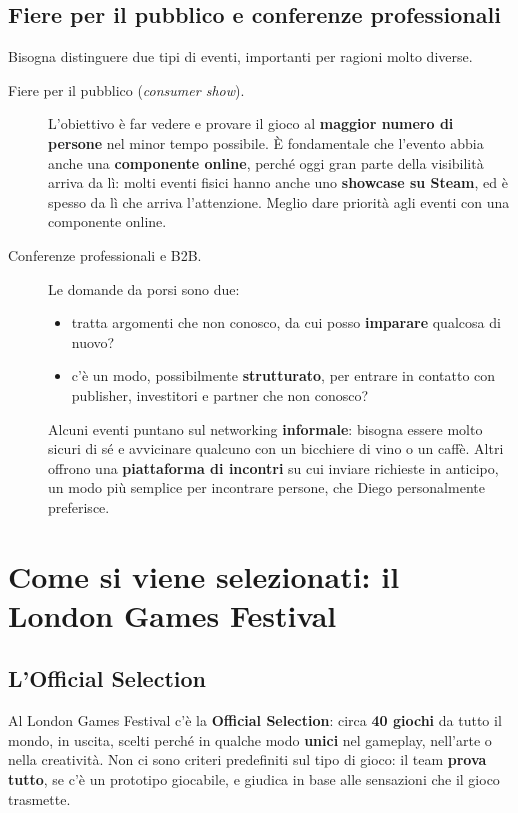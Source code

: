 \subsection{Fiere per il pubblico e conferenze professionali}

Bisogna distinguere due tipi di eventi, importanti per ragioni molto diverse.
\begin{description}
  \item[Fiere per il pubblico (\emph{consumer show}).] L'obiettivo è far vedere e
        provare il gioco al \textbf{maggior numero di persone} nel minor tempo
        possibile. È fondamentale che l'evento abbia anche una
        \textbf{componente online}, perché oggi gran parte della visibilità
        arriva da lì: molti eventi fisici hanno anche uno \textbf{showcase su
        Steam}, ed è spesso da lì che arriva l'attenzione. Meglio dare priorità
        agli eventi con una componente online.
  \item[Conferenze professionali e B2B.] Le domande da porsi sono due:
        \begin{itemize}
          \item tratta argomenti che non conosco, da cui posso \textbf{imparare}
                qualcosa di nuovo?
          \item c'è un modo, possibilmente \textbf{strutturato}, per entrare in
                contatto con publisher, investitori e partner che non conosco?
        \end{itemize}
        Alcuni eventi puntano sul networking \textbf{informale}: bisogna essere
        molto sicuri di sé e avvicinare qualcuno con un bicchiere di vino o un
        caffè. Altri offrono una \textbf{piattaforma di incontri} su cui inviare
        richieste in anticipo, un modo più semplice per incontrare persone, che
        Diego personalmente preferisce.
\end{description}

\section{Come si viene selezionati: il London Games Festival}
\label{sec:c3-1-selezione}

\subsection{L'Official Selection}

Al London Games Festival c'è la \textbf{Official Selection}: circa \textbf{40
giochi} da tutto il mondo, in uscita, scelti perché in qualche modo
\textbf{unici} nel gameplay, nell'arte o nella creatività. Non ci sono criteri
predefiniti sul tipo di gioco: il team \textbf{prova tutto}, se c'è un prototipo
giocabile, e giudica in base alle sensazioni che il gioco trasmette.

